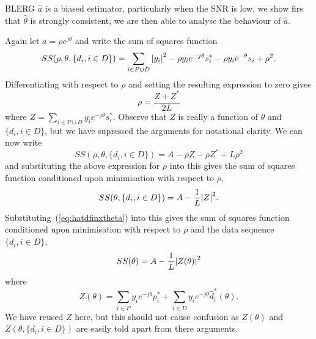 \documentclass[a4paper,10pt]{article}
\begin{document}
BLERG $\hat{a}$ is a biased estimator, particularly when the SNR is low, we show firs that $\hat{\theta}$ is strongly consistent, we are then able to analyse the behaviour of $\hat{a}$.

Again let $a = \rho e^{j\theta}$ and write the sum of squares function  
\[
SS(\rho, \theta, \{d_i, i \in D\}) = \sum_{i \in P \cup D} {\left| y_i \right|}^2 - \rho y_i e^{-j\theta} s_i^* - \rho y_i e^{-\theta} s_i + \rho^2.
\]
Differentiating with respect to $\rho$ and setting the resulting expression to zero gives 
\[
\rho = \frac{Z + Z^*}{2L}
\]
where $Z = \sum_{i\in P \cup D}y_i e^{-j\theta} s_i^*$.  Observe that $Z$ is really a function of $\theta$ and $\{d_i, i \in D\}$, but we have supressed the arguments for notational clarity.  We can now write
\[
SS(\rho, \theta, \{d_i, i \in D\}) = A - \rho Z - \rho Z^* + L \rho^2
\]
and substituting the above expression for $\rho$ into this gives the sum of squares function conditioned upon minimisation with respect to $\rho$,
\[
SS(\theta, \{d_i, i \in D\}) = A - \frac{1}{L}{\left| Z \right|}^2.
\]
Substituting~(\ref{eq:hatdfinxtheta}) into this gives the sum of squares function conditioned upon minimisation with respect to $\rho$ and the data sequence $\{d_i, i \in D\}$,
\[
SS(\theta) = A - \frac{1}{L}{\left| Z(\theta) \right|}^2
\]
where
\[
Z(\theta)  = \sum_{i \in P} y_i e^{-j\theta} p_i^* + \sum_{i \in D} y_i e^{-j\theta} \hat{d}_i^*(\theta).
\]
We have reused $Z$ here, but this should not cause confusion as $Z(\theta)$ and $Z(\theta, \{d_i, i \in D\})$ are easily told apart from there arguments.  %
\end{document}
